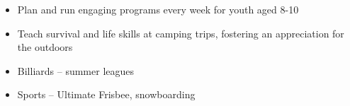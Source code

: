 \documentclass{resume}
\begin{document}
\VolunteerWorkExperience

\begin{itemize}
	\item Plan and run engaging programs every week for youth aged 8-10
	\item Teach survival and life skills at camping trips, fostering an appreciation for the outdoors
\end{itemize}

\Education


\Intrests

\begin{itemize}
	\item Billiards -- summer leagues
	\item Sports -- Ultimate Frisbee, snowboarding
\end{itemize}
\end{document}
